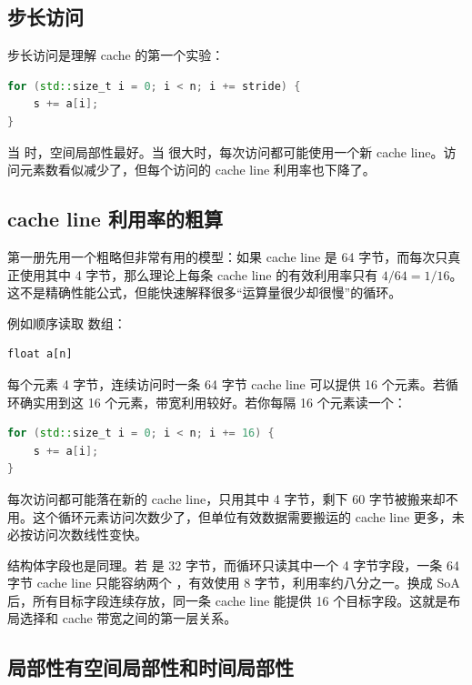 \subsection{步长访问}

步长访问是理解 cache 的第一个实验：

\begin{lstlisting}[language=C++]
for (std::size_t i = 0; i < n; i += stride) {
    s += a[i];
}
\end{lstlisting}

当  时，空间局部性最好。当  很大时，每次访问都可能使用一个新 cache line。访问元素数看似减少了，但每个访问的 cache line 利用率也下降了。

\subsection{cache line 利用率的粗算}

第一册先用一个粗略但非常有用的模型：如果 cache line 是 64 字节，而每次只真正使用其中 4 字节，那么理论上每条 cache line 的有效利用率只有 \(4/64 = 1/16\)。这不是精确性能公式，但能快速解释很多“运算量很少却很慢”的循环。

例如顺序读取  数组：

\begin{lstlisting}
float a[n]
\end{lstlisting}

每个元素 4 字节，连续访问时一条 64 字节 cache line 可以提供 16 个元素。若循环确实用到这 16 个元素，带宽利用较好。若你每隔 16 个元素读一个：

\begin{lstlisting}[language=C++]
for (std::size_t i = 0; i < n; i += 16) {
    s += a[i];
}
\end{lstlisting}

每次访问都可能落在新的 cache line，只用其中 4 字节，剩下 60 字节被搬来却不用。这个循环元素访问次数少了，但单位有效数据需要搬运的 cache line 更多，未必按访问次数线性变快。

结构体字段也是同理。若  是 32 字节，而循环只读其中一个 4 字节字段，一条 64 字节 cache line 只能容纳两个 ，有效使用 8 字节，利用率约八分之一。换成 SoA 后，所有目标字段连续存放，同一条 cache line 能提供 16 个目标字段。这就是布局选择和 cache 带宽之间的第一层关系。

\subsection{局部性有空间局部性和时间局部性}

